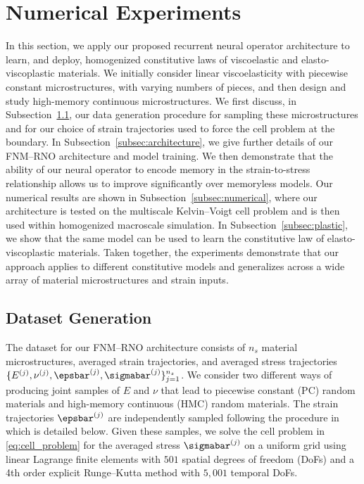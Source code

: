 \documentclass[letterpaper,11pt]{article}
\begin{document}
\section{Numerical Experiments}\label{sec:N}
In this section, we apply our proposed recurrent neural operator architecture to learn,
and deploy, homogenized constitutive laws of viscoelastic and elasto-viscoplastic materials. We initially consider linear viscoelasticity with piecewise constant microstructures, with varying numbers of pieces, and then design and study high-memory continuous microstructures. We first discuss, in Subsection~\ref{subsec:data_set}, our data generation procedure for sampling these microstructures and for our choice of strain trajectories used to force the cell problem at the boundary. In Subsection~\ref{subsec:architecture}, we give further details of our FNM--RNO architecture and model training. We then demonstrate that the ability of our neural operator to encode memory in the strain-to-stress relationship allows us to improve significantly over memoryless models. Our numerical results are shown in Subsection~\ref{subsec:numerical}, where our architecture is tested on the multiscale Kelvin--Voigt cell problem and is then used within homogenized macroscale simulation. In Subsection~\ref{subsec:plastic}, we show that the same model can be used to learn the constitutive law of elasto-viscoplastic materials. Taken together, the experiments demonstrate that our approach applies to different constitutive models and generalizes across a wide array of material microstructures and strain inputs.

\subsection{Dataset Generation}\label{subsec:data_set}
The dataset for our FNM--RNO architecture consists of $n_s$ material microstructures, averaged strain trajectories, and averaged stress trajectories $\{E^{(j)}, \nu^{(j)}, \epsbar^{(j)}, \sigmabar^{(j)}\}_{j=1}^{n_s}$. We consider two different ways of producing joint samples of $E$ and $\nu$ that lead to piecewise constant (PC) random materials and high-memory continuous (HMC) random materials. The strain trajectories $\epsbar^{(j)}$ are independently sampled following the procedure in~\cite{bhattacharya2023learning, liu2023learning, zhang2024iterated} which is detailed below. Given these samples, we solve the cell problem in \eqref{eq:cell_problem} for the averaged stress $\sigmabar^{(j)}$ on a uniform grid using linear Lagrange finite elements with $501$ spatial degrees of freedom (DoFs) and a 4th order explicit Runge--Kutta method with $5,001$ temporal DoFs.
\end{document}
